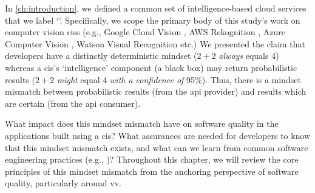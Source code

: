 \label{sec:lit-review:preface}

In \cref{ch:introduction}, we defined a common set of intelligence-based cloud services that we label `'. Specifically, we scope the primary body of this study's work on computer vision \glspl{cis} (e.g., Google Cloud Vision \citep{GoogleCloud:Home}, AWS Rekognition \citep{AWS:Home}, Azure Computer Vision \citep{Azure:Home}, Watson Visual Recognition \citep{IBM:Home} etc.) We presented the claim that developers have a distinctly deterministic mindset ($2+2$ \textit{always}  equals 4) whereas a \gls{cis}'s `intelligence' component (a black box) may return probabilistic results ($2+2$ \textit{might} equal 4 \textit{with a confidence of} 95\%). Thus, there is a mindset mismatch between probabilistic results (from the \gls{api} provider) and results which are certain (from the \gls{api} consumer).

What impact does this mindset mismatch have on software quality in the applications built using a \gls{cis}? What assurances are needed for developers to know that this mindset mismatch exists, and what can we learn from common software engineering practices (e.g., \citep{Pressman:2005vf,Sommerville:2011uc})? Throughout this chapter, we will review the core principles of this mindset mismatch from the anchoring perspective of software quality, particularly around \gls{vv}.